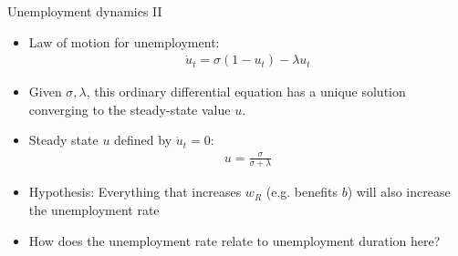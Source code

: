 \documentclass[9pt]{beamer}
\newcommand{\bit}{\begin{itemize}}
\newcommand{\eit}{\end{itemize}}
\newcommand{\bc}{\color{blue}}
\begin{document}
\begin{frame}{Unemployment dynamics II}

\bit
\setlength\itemsep{2em}

\item {\bc Law of motion for unemployment}:
\begin{eqnarray}
\dot u_t = \sigma (1-u_t) -\lambda u_t \nonumber
\end{eqnarray}

\item Given $\sigma, \lambda$, this {\bc ordinary differential equation} has a unique solution converging to the steady-state value $u$.

\item Steady state $u$ defined by $\dot{u}_t = 0$:
\begin{eqnarray}
u = \frac{\sigma}{\sigma + \lambda} \nonumber
\end{eqnarray}

\item {\bc Hypothesis: Everything that increases $w_R$ (e.g. benefits $b$) will also increase the unemployment rate}

\item How does the unemployment rate relate to unemployment duration here?


\eit


\end{frame}
\end{document}
